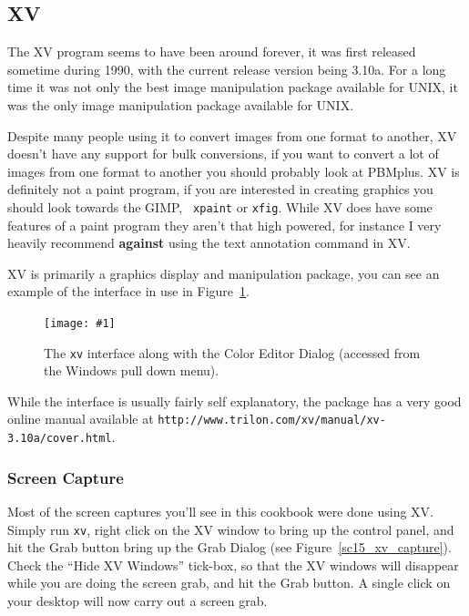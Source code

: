 \documentclass[twoside,11pt]{article}
\newcommand{\htmladdnormallink}[2]{#1}
\newcommand{\htmladdimg}[1]{}
\newcommand{\htmlref}[2]{#1}
\newcommand{\latex}[1]{#1}
\newcommand{\xlabel}[1]{}
\newcommand{\myfig}[5]{
  \begin{figure}
    \centering\texttt{[image: \#1]}
    \typeout{#1 inserted on page \arabic{page}}
    \caption{\label{#4}#5}
  \end{figure}
  }
\newcommand{\myfig}[5]{
    \label{#4} \htmladdimg{#3}\\
    Figure: #5\\
  }
\begin{document}

\subsection{\xlabel{sc15_xv}XV\label{sc15_xv}}

The \htmladdnormallink{XV}{http://www.trilon.com/xv/} program seems to
have been around forever, it was first released sometime during 1990,
with the current release version being 3.10a. For a long time it was
not only the best image manipulation package available for UNIX, it
was the only image manipulation package available for UNIX. 

Despite many people using it to convert images from one format to
another, XV doesn't have any support for bulk conversions, if you want
to convert a lot of images from one format to another you should
probably look at \htmlref{PBMplus}{sc15_pbmplus}. XV is definitely not
a paint program, if you are interested in creating graphics you should
look towards the \htmlref{GIMP}{sc15_gimp}, \htmlref{{\tt
xpaint}}{sc15_xpaint} or \htmlref{{\tt xfig}}{sc15_xfig}. While XV
does have some features of a paint program they aren't that high
powered, for instance I very heavily recommend {\bf against} using the
text annotation command in XV.

XV is primarily a graphics display and manipulation package, you can
see an example of the interface in use in
Figure~\ref{sc15_xv_interface}.

\myfig{sc15_xv.eps}{height=0.8\textheight}{sc15_xv.gif}{sc15_xv_interface}{The
{\tt xv} interface along with the Color Editor Dialog (accessed from
the Windows pull down menu).} 

While the interface is usually fairly self explanatory, the package
has a very good online
\htmladdnormallink{manual}{http://www.trilon.com/xv/manual/xv-3.10a/cover.html}\latex{
available at {\tt http://www.trilon.com/xv/manual/xv-3.10a/cover.html}}.

\subsubsection{Screen Capture}

Most of the screen captures you'll see in this cookbook were done
using XV. Simply run {\tt xv}, right click on the XV window to bring
up the control panel, and hit the {\sc Grab} button bring up the Grab
Dialog (see Figure~\ref{sc15_xv_capture}). Check the ``Hide XV
Windows'' tick-box, so that the XV windows will disappear while you
are doing the screen grab, and hit the {\sc Grab} button. A single
click on your desktop will now carry out a screen grab.
\end{document}
